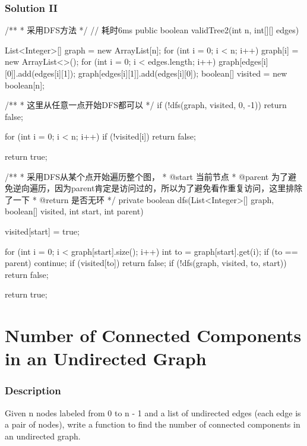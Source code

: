 \newpage

\subsubsection{Solution II}

\begin{Code}
/**
 * 采用DFS方法
 */
// 耗时6ms
public boolean validTree2(int n, int[][] edges) {
    List<Integer>[] graph = new ArrayList[n];
    for (int i = 0; i < n; i++) {
        graph[i] = new ArrayList<>();
    }
    for (int i = 0; i < edges.length; i++) {
        graph[edges[i][0]].add(edges[i][1]);
        graph[edges[i][1]].add(edges[i][0]);
    }
    boolean[] visited = new boolean[n];

    /**
     * 这里从任意一点开始DFS都可以
     */
    if (!dfs(graph, visited, 0, -1)) {
        return false;
    }

    for (int i = 0; i < n; i++) {
        if (!visited[i]) {
            return false;
        }
    }

    return true;
}

/**
 * 采用DFS从某个点开始遍历整个图，
 * @start 当前节点
 * @parent 为了避免逆向遍历，因为parent肯定是访问过的，所以为了避免看作重复访问，这里排除了一下
 * @return 是否无环
 */
private boolean dfs(List<Integer>[] graph, boolean[] visited, int start, int parent) {
    visited[start] = true;

    for (int i = 0; i < graph[start].size(); i++) {
        int to = graph[start].get(i);
        if (to == parent) {
            continue;
        }
        if (visited[to]) {
            return false;
        }
        if (!dfs(graph, visited, to, start)) {
            return false;
        }
    }

    return true;
}
\end{Code}

\newpage

\section{Number of Connected Components in an Undirected Graph} %

\subsubsection{Description}

Given n nodes labeled from 0 to n - 1 and a list of undirected edges (each edge is a pair of nodes), write a function to find the number of connected components in an undirected graph.

